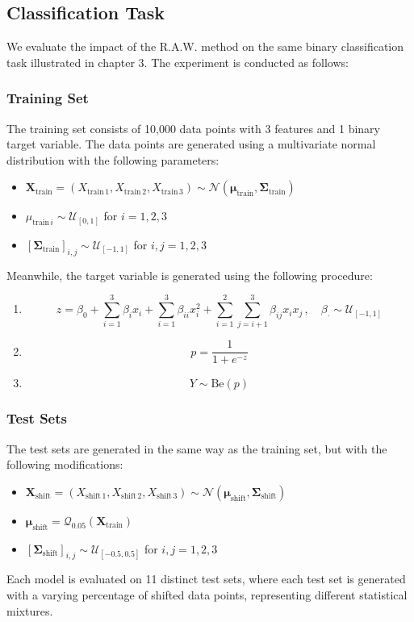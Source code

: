 \subsection{Classification Task}

We evaluate the impact of the R.A.W. method on the same binary classification task illustrated in chapter 3. The experiment is conducted as follows:
\subsubsection{Training Set}
The training set consists of 10,000 data points with 3 features and 1 binary target variable. The data points are generated using a multivariate normal distribution with the following parameters:

\begin{itemize}
    \item $ \boldsymbol{X}_{\text{train}} = (X_{\text{train}\,1}, X_{\text{train}\,2}, X_{\text{train}\,3}) \sim \mathcal{N}(\boldsymbol{\mu}_{\text{train}}, \boldsymbol{\Sigma}_{\text{train}}) $
    \item $ \mu_{\text{train}\,i} \sim \mathcal{U}_{[0,1]} $ for $ i = 1, 2, 3 $
    \item $ [\boldsymbol{\Sigma}_{\text{train}}]_{i,j} \sim \mathcal{U}_{[-1,1]} $ for $ i, j = 1, 2, 3 $
\end{itemize}

Meanwhile, the target variable is generated using the following procedure:

\begin{enumerate}
    \item $$ 
    z = \beta_0 + \sum_{i=1}^3 \beta_i x_i + \sum_{i=1}^3 \beta_{ii} x_i^2 + \sum_{i=1}^{2} \sum_{j=i+1}^3 \beta_{ij} x_i x_j\,,   \quad \beta_{\cdot} \sim \mathcal{U}_{[-1,1]}
    $$
    \item $$ p = \frac{1}{1 + e^{-z}}$$
    \item $$ Y \sim \text{Be}(p)$$
\end{enumerate}

\subsubsection{Test Sets}
The test sets are generated in the same way as the training set, but with the following modifications:

\begin{itemize}
    \item $ \boldsymbol{X}_{\text{shift}} = (X_{\text{shift}\,1}, X_{\text{shift}\,2}, X_{\text{shift}\,3}) \sim \mathcal{N}(\boldsymbol{\mu}_{\text{shift}}, \boldsymbol{\Sigma}_{\text{shift}}) $
    \item $ \boldsymbol{\mu}_{\text{shift}} = \mathcal{Q}_{0.05}(\boldsymbol{X}_{\text{train}})$
    \item $ [\boldsymbol{\Sigma}_{\text{shift}}]_{i,j} \sim \mathcal{U}_{[-0.5,0.5]} $ for $ i, j = 1, 2, 3 $
\end{itemize}
Each model is evaluated on 11 distinct test sets, where each test set is generated with a varying percentage of shifted data points, representing different statistical mixtures.

